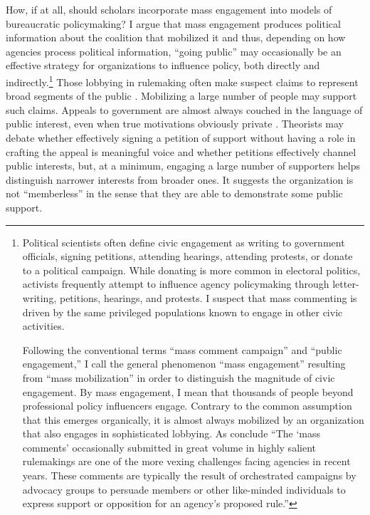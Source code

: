 How, if at all, should scholars incorporate mass engagement into models of bureaucratic policymaking? 
I argue that mass engagement produces political information about the coalition that mobilized it and thus, depending on how agencies process political information, ``going public'' may occasionally be an effective strategy for organizations to influence policy, both directly and indirectly.\footnote{
Political scientists often define civic engagement as writing to government officials, signing petitions, attending hearings, attending protests, or donate to a political campaign. While donating is more common in electoral politics, activists frequently attempt to influence agency policymaking through letter-writing, petitions, hearings, and protests. I suspect that mass commenting is driven by the same privileged populations known to engage in other civic activities. %

Following the conventional terms ``mass comment campaign'' and ``public engagement,'' I call the general phenomenon ``mass engagement'' resulting from ``mass mobilization'' in order to distinguish the magnitude of civic engagement.
By mass engagement, I mean that thousands of people beyond professional policy influencers engage. Contrary to the common assumption that this emerges organically, it is almost always mobilized by an organization that also engages in sophisticated lobbying. %
As \citet{SantAmbrogio2018} conclude ``The `mass comments' occasionally submitted in great volume in highly salient
rulemakings are one of the more vexing challenges facing agencies in recent years. These comments are typically the result of orchestrated campaigns by advocacy groups to persuade members or other like-minded individuals to express support or opposition for an agency's proposed rule.''
}
Those lobbying in rulemaking often make suspect claims to represent broad segments of the public \citep{Seifter2016UCLA}. Mobilizing a large number of people may support such claims.
Appeals to government are almost always couched in the language of public interest, even when true motivations obviously private \citep{Schattschneider1975}. Theorists may debate whether effectively signing a petition of support without having a role in crafting the appeal is meaningful voice and whether petitions effectively channel public interests, but, at a minimum, engaging a large number of supporters helps distinguish narrower interests from broader ones. It suggests the organization is not ``memberless'' \citep{Skocpol2003} in the sense that they are able to demonstrate some public support.

